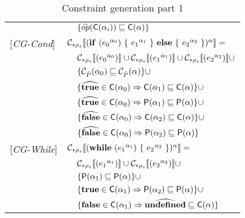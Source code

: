 \begin{table}
\begin{tabular}{l l l l}
&&\multicolumn{2}{l}{$\{ \widehat{op} (\mathsf{C}(\alpha_i)) \sqsubseteq \mathsf{C}(\alpha) \}$}\\
{[\textit{CG-Cond}]}&\multicolumn{3}{l}{$\mathcal{C}_{*\rho_s}\llbracket (\mathbf{if}\ ({e_0}^{\alpha_0})\ \{\ {e_1}^{\alpha_1}\ \}\ \mathbf{else}\ \{\ {e_2}^{\alpha_2}\ \})^\alpha \rrbracket = $}\\
&&\multicolumn{2}{l}{$ \mathcal{C}_{*\rho_s}\llbracket ({e_0}^{\alpha_0}) \rrbracket \cup \mathcal{C}_{*\rho_s}\llbracket ({e_1}^{\alpha_1}) \rrbracket \cup \mathcal{C}_{*\rho_s}\llbracket ({e_2}^{\alpha_2}) \rrbracket \cup$}\\
&&\multicolumn{2}{l}{$\{ {\cal C}_{\hat{P}}(\alpha_0) \sqsubseteq {\cal C}_{\hat{P}}(\alpha) \} \cup$} \\
&&\multicolumn{2}{l}{$\{ \widehat{\mathbf{true}} \in \mathsf{C}(\alpha_0) \Rightarrow \mathsf{C}(\alpha_1) \sqsubseteq \mathsf{C}(\alpha) \}\cup$}\\
&&\multicolumn{2}{l}{$\{ \widehat{\mathbf{true}} \in \mathsf{C}(\alpha_0) \Rightarrow \mathsf{P}(\alpha_1) \sqsubseteq \mathsf{P}(\alpha) \}\cup$} \\
&&\multicolumn{2}{l}{$\{ \widehat{\mathbf{false}} \in \mathsf{C}(\alpha_0) \Rightarrow \mathsf{C}(\alpha_2) \sqsubseteq \mathsf{C}(\alpha) \}\cup$}\\
&&\multicolumn{2}{l}{$\{ \widehat{\mathbf{false}} \in \mathsf{C}(\alpha_0) \Rightarrow \mathsf{P}(\alpha_2) \sqsubseteq \mathsf{P}(\alpha) \}$} \\
{[\textit{CG-While}]}&\multicolumn{3}{l}{$\mathcal{C}_{*\rho_s}\llbracket (\mathbf{while}\ ({e_1}^{\alpha_1})\ \{\ {e_2}^{\alpha_2}\ \})^\alpha \rrbracket = $}\\
&&\multicolumn{2}{l}{$ \mathcal{C}_{*\rho_s}\llbracket ({e_1}^{\alpha_1}) \rrbracket \cup \mathcal{C}_{*\rho_s}\llbracket ({e_2}^{\alpha_2}) \rrbracket \cup $}\\
&&\multicolumn{2}{l}{$\{ \mathsf{P}(\alpha_1) \sqsubseteq \mathsf{P}(\alpha) \} \cup$} \\
&&\multicolumn{2}{l}{$\{ \mathbf{true} \in \mathsf{C}(\alpha_1) \Rightarrow \mathsf{P}(\alpha_2) \sqsubseteq \mathsf{P}(\alpha)  \}\cup$}\\
&&\multicolumn{2}{l}{$\{ \mathbf{false} \in \mathsf{C}(\alpha_1) \Rightarrow \widehat{\mathbf{undefined}} \sqsubseteq \mathsf{C}(\alpha) \}$}\\
\end{tabular}
\caption{Constraint generation part 1}
\label{tab:ConstGen1}
\end{table}

